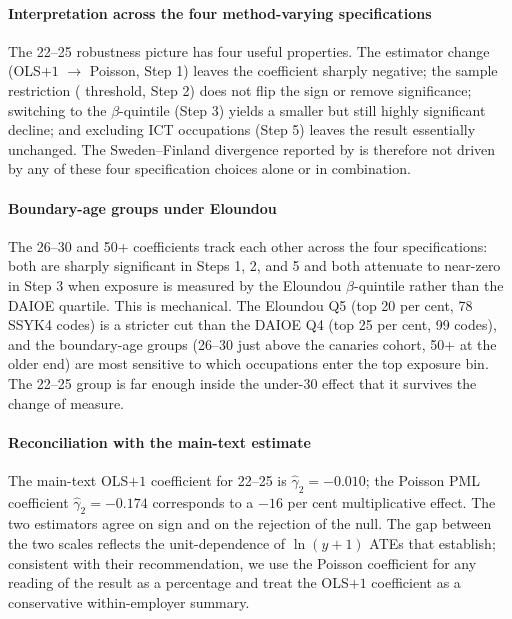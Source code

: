 \documentclass[preprint,12pt,authoryear]{elsarticle}
\begin{document}
\paragraph{Interpretation across the four method-varying specifications}
The 22--25 robustness picture has four useful properties. The estimator change (OLS$+1$ $\rightarrow$ Poisson, Step 1) leaves the coefficient sharply negative; the sample restriction (\citet{brynjolfsson2025canaries} threshold, Step 2) does not flip the sign or remove significance; switching to the \citet{eloundou2024gpts} $\beta$-quintile (Step 3) yields a smaller but still highly significant decline; and excluding ICT occupations (Step 5) leaves the result essentially unchanged. The Sweden--Finland divergence reported by \citet{kauhanen2026youth} is therefore not driven by any of these four specification choices alone or in combination.

\paragraph{Boundary-age groups under Eloundou} The 26--30 and 50+ coefficients track each other across the four specifications: both are sharply significant in Steps 1, 2, and 5 and both attenuate to near-zero in Step 3 when exposure is measured by the Eloundou $\beta$-quintile rather than the DAIOE quartile. This is mechanical. The Eloundou Q5 (top 20 per cent, 78 SSYK4 codes) is a stricter cut than the DAIOE Q4 (top 25 per cent, 99 codes), and the boundary-age groups (26--30 just above the canaries cohort, 50+ at the older end) are most sensitive to which occupations enter the top exposure bin. The 22--25 group is far enough inside the under-30 effect that it survives the change of measure.

\paragraph{Reconciliation with the main-text estimate} The main-text OLS$+1$ coefficient for 22--25 is $\hat\gamma_2 = -0.010$; the Poisson PML coefficient $\hat\gamma_2 = -0.174$ corresponds to a $-16$ per cent multiplicative effect. The two estimators agree on sign and on the rejection of the null. The gap between the two scales reflects the unit-dependence of $\ln(y+1)$ ATEs that \citet{chen2024logs} establish; consistent with their recommendation, we use the Poisson coefficient for any reading of the result as a percentage and treat the OLS$+1$ coefficient as a conservative within-employer summary.
\end{document}
